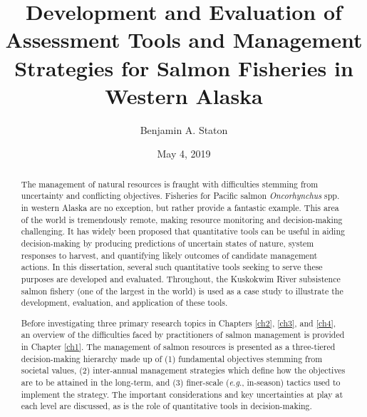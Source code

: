 \documentclass[12pt,]{book}
\title{}
\author{}
\date{}
\title{Development and Evaluation of Assessment Tools and Management Strategies for Salmon Fisheries in Western Alaska}
\author{Benjamin A. Staton}
\date{May 4, 2019} %
\theoremstyle{definition}
\theoremstyle{definition}
\theoremstyle{definition}
\theoremstyle{remark}
\begin{document}
\begin{romanpages}      %

\TitlePage 

\doublespacing
\setlength{\parskip}{0pt plus 0pt minus 0pt}

\begin{abstract} 
\noindent
The management of natural resources is fraught with difficulties stemming from uncertainty and conflicting objectives. Fisheries for Pacific salmon \textit{Oncorhynchus} spp. in western Alaska are no exception, but rather provide a fantastic example. This area of the world is tremendously remote, making resource monitoring and decision-making challenging. It has widely been proposed that quantitative tools can be useful in aiding decision-making by producing predictions of uncertain states of nature, system responses to harvest, and quantifying likely outcomes of candidate management actions. In this dissertation, several such quantitative tools seeking to serve these purposes are developed and evaluated. Throughout, the Kuskokwim River subsistence salmon fishery (one of the largest in the world) is used as a case study to illustrate the development, evaluation, and application of these tools.

Before investigating three primary research topics in Chapters \ref{ch2}, \ref{ch3}, and \ref{ch4}, an overview of the difficulties faced by practitioners of salmon management is provided in Chapter \ref{ch1}. The management of salmon resources is presented as a three-tiered decision-making hierarchy made up of (1) fundamental objectives stemming from societal values, (2) inter-annual management strategies which define how the objectives are to be attained in the long-term, and (3) finer-scale (\textit{e}.\textit{g}., in-season) tactics used to implement the strategy. The important considerations and key uncertainties at play at each level are discussed, as is the role of quantitative tools in decision-making.


\end{abstract}
\end{romanpages}
\end{document}
